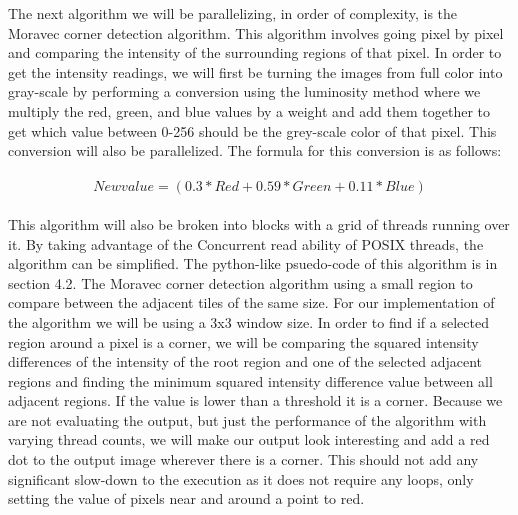 \documentclass{article}
\begin{document}
        The next algorithm we will be parallelizing, in order of complexity, is the Moravec corner detection algorithm.  This algorithm involves going pixel by pixel and comparing the intensity of the surrounding regions of that pixel.  In order to get the intensity readings, we will first be turning the images from full color into gray-scale by performing a conversion using the luminosity method where we multiply the red, green, and blue values by a weight and add them together to get which value between 0-256 should be the grey-scale color of that pixel.  This conversion will also be parallelized.  The formula for this conversion is as follows:\\\\
        
        \[New value = (0.3*Red + 0.59*Green + 0.11*Blue)\]\\
        
        This algorithm will also be broken into blocks with a grid of threads running over it.  By taking advantage of the Concurrent read ability of POSIX threads, the algorithm can be simplified.  The python-like psuedo-code of this algorithm is in section 4.2.  The Moravec corner detection algorithm using a small region to compare between the adjacent tiles of the same size.  For our implementation of the algorithm we will be using a 3x3 window size.  In order to find if a selected region around a pixel is a corner, we will be comparing the squared intensity differences of the intensity of the root region and one of the selected adjacent regions and finding the minimum squared intensity difference value between all adjacent regions.  If the value is lower than a threshold it is a corner.  Because we are not evaluating the output, but just the performance of the algorithm with varying thread counts, we will make our output look interesting and add a red dot to the output image wherever there is a corner.  This should not add any significant slow-down to the execution as it does not require any loops, only setting the value of pixels near and around a point to red.
        
\end{document}
